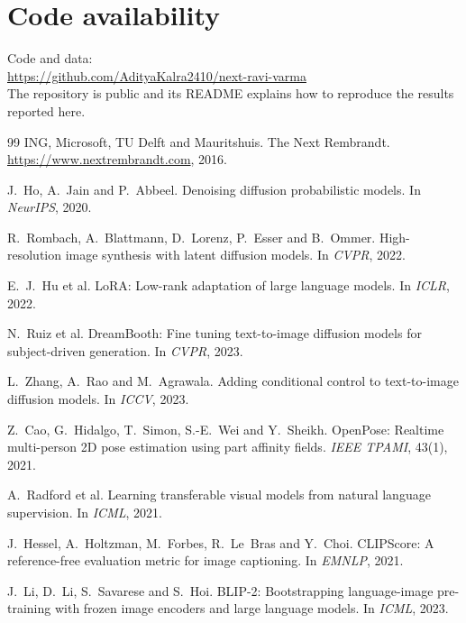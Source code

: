 \documentclass[11pt,a4paper,twocolumn]{article}
\newcommand{\githuburl}{https://github.com/AdityaKalra2410/next-ravi-varma}
\begin{document}
\section*{Code availability}
\noindent Code and data:\\
\url{\githuburl}\\
The repository is public and its README explains how to reproduce the results reported here.

\begin{thebibliography}{99}
\small
{}
ING, Microsoft, TU Delft and Mauritshuis.
\newblock The Next Rembrandt.
\newblock \url{https://www.nextrembrandt.com}, 2016.

J.~Ho, A.~Jain and P.~Abbeel.
\newblock Denoising diffusion probabilistic models.
\newblock In \emph{NeurIPS}, 2020.

R.~Rombach, A.~Blattmann, D.~Lorenz, P.~Esser and B.~Ommer.
\newblock High-resolution image synthesis with latent diffusion models.
\newblock In \emph{CVPR}, 2022.

E.~J.~Hu et al.
\newblock LoRA: Low-rank adaptation of large language models.
\newblock In \emph{ICLR}, 2022.

N.~Ruiz et al.
\newblock DreamBooth: Fine tuning text-to-image diffusion models for subject-driven generation.
\newblock In \emph{CVPR}, 2023.

L.~Zhang, A.~Rao and M.~Agrawala.
\newblock Adding conditional control to text-to-image diffusion models.
\newblock In \emph{ICCV}, 2023.

Z.~Cao, G.~Hidalgo, T.~Simon, S.-E.~Wei and Y.~Sheikh.
\newblock OpenPose: Realtime multi-person 2D pose estimation using part affinity fields.
\newblock \emph{IEEE TPAMI}, 43(1), 2021.

A.~Radford et al.
\newblock Learning transferable visual models from natural language supervision.
\newblock In \emph{ICML}, 2021.

J.~Hessel, A.~Holtzman, M.~Forbes, R.~Le~Bras and Y.~Choi.
\newblock CLIPScore: A reference-free evaluation metric for image captioning.
\newblock In \emph{EMNLP}, 2021.

J.~Li, D.~Li, S.~Savarese and S.~Hoi.
\newblock BLIP-2: Bootstrapping language-image pre-training with frozen image encoders and large language models.
\newblock In \emph{ICML}, 2023.


\end{thebibliography}
\end{document}
